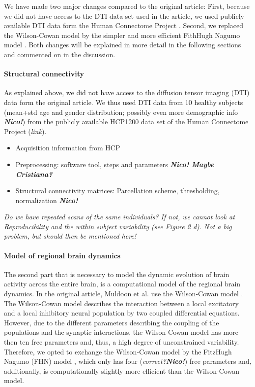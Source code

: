We have made two major changes compared to the original article: First, because we did not have access to the DTI data set used in the article, we used publicly
available DTI data form the Human Connectome Project \supercite{}. Second, we replaced the Wilson-Cowan model \supercite{Wilson1972} by the simpler and 
more efficient FithHugh Nagumo model \supercite{FitzHugh1961}. Both changes will be explained in more detail in the following sections and commented on in the 
discussion.
\paragraph{Structural connectivity}
As explained above, we did not have access to the diffusion tensor imaging (DTI) data form the original article. We thus used DTI data from 10 healthy
subjects (mean+std age and gender distribution; possibly even more demographic info \textbf{\textit{Nico!}}) from the publicly available HCP1200 data set of the
Human Connectome Project (\textit{link}).

\begin{itemize}
 \item 
  Acquisition information from HCP
 \item
  Preprocessing: software tool, steps and parameters  \textbf{\textit{Nico! Maybe Cristiana?}}
 \item
  Structural connectivity matrices: Parcellation scheme, thresholding, normalization \textbf{\textit{Nico!}}
\end{itemize}

\textit{Do we have repeated scans of the same individuals? If not, we cannot look at Reproducibility and the within subject
variability (see Figure 2 d). Not a big problem, but should then be mentioned here!}

\paragraph{Model of regional brain dynamics}
The second part that is necessary to model the dynamic evolution of brain activity across the entire brain, is a computational model of the
regional brain dynamics. In the original article, Muldoon et al. \supercite{Muldoon2016} use the Wilson-Cowan model \supercite{Wilson1972}. The Wilson-Cowan model
describes the interaction between a local excitatory and a local inhibitory neural population by two coupled differential equations. However, due to the different
parameters describing the coupling of the populations and the synaptic interactions, the Wilson-Cowan model has more then ten free parameters and, thus,
a high degree of unconstrained variability. Therefore, we opted to exchange the Wilson-Cowan model by the FitzHugh Nagumo (FHN) model \supercite{FitzHugh1961}, which
only has four (\textit{correct?}\textbf{\textit{Nico!}}) free parameters and, additionally, is computationally slightly more efficient than the Wilson-Cowan model.

